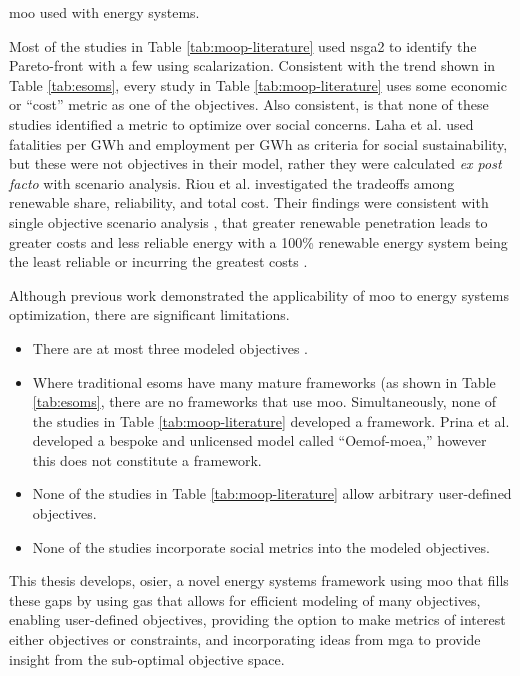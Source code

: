 \begin{table}[ht!]
    \centering
    \caption{\ac{moo} used with energy systems.}
    \label{tab:moop-literature}
    \resizebox*{\textwidth}{!}{}
\end{table}
Most of the studies in Table \ref{tab:moop-literature} used \ac{nsga2} to
identify the Pareto-front with a few using scalarization. Consistent with the
trend shown in Table \ref{tab:esoms}, every study in Table
\ref{tab:moop-literature} uses some economic or ``cost'' metric as one of the
objectives. Also consistent, is that none of these studies identified a metric
to optimize over social concerns. Laha et al. \cite{laha_low_2021} used
fatalities per GWh and employment per GWh as criteria for social sustainability,
but these were not objectives in their model, rather they were calculated
\textit{ex post facto} with scenario analysis. Riou et al.
\cite{riou_multi-objective_2021} investigated the tradeoffs among renewable
share, reliability, and total cost. Their findings were consistent with single
objective scenario analysis \cite{de_sisternes_value_2016}, that greater
renewable penetration leads to greater costs and less reliable energy with a
100\% renewable energy system being the least reliable or incurring the greatest
costs \cite{riou_multi-objective_2021}. 

Although previous work demonstrated the applicability of \ac{moo} to energy
systems optimization, there are significant limitations. 
\begin{itemize}
    \item{There are at most three modeled objectives
    \cite{riou_multi-objective_2021,de-leon_almaraz_deployment_2015,
    de-leon_almaraz_assessment_2013}.}
    \item{Where traditional \acp{esom} have many mature frameworks (as shown in
    Table \ref{tab:esoms}, there are no frameworks that use \ac{moo}.
    Simultaneously, none of the studies in Table \ref{tab:moop-literature}
    developed a framework. Prina et al. developed a bespoke and unlicensed model
    called ``Oemof-moea,'' however this does not constitute a framework.}
    \item{None of the studies in Table \ref{tab:moop-literature} allow
    arbitrary user-defined objectives.}
    \item{None of the studies incorporate social metrics into the modeled objectives.}
\end{itemize}

This thesis develops, \ac{osier}, a novel energy systems framework using
\ac{moo} that fills these gaps by using \acp{ga} that allows for efficient
modeling of many objectives, enabling user-defined objectives, providing the
option to make metrics of interest either objectives or constraints, and
incorporating ideas from \ac{mga} to provide insight from the sub-optimal
objective space.


